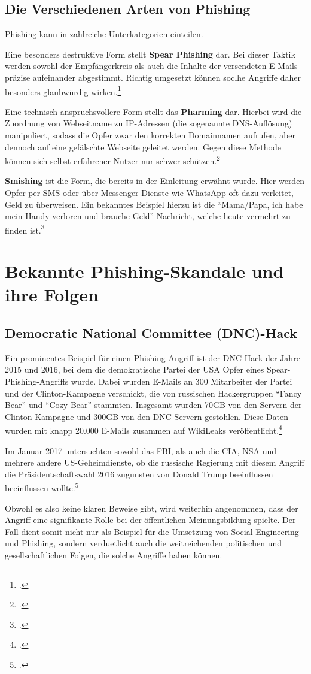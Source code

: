 \documentclass[12pt, a4paper, oneside]{scrartcl}
\begin{document}
\subsection{Die Verschiedenen Arten von Phishing}
Phishing kann in zahlreiche Unterkategorien einteilen. 
\par
Eine besonders destruktive Form stellt \textbf{Spear Phishing} dar. Bei dieser Taktik werden sowohl der Empfängerkreis als auch 
die Inhalte der versendeten E-Mails präzise aufeinander abgestimmt. Richtig umgesetzt können 
soclhe Angriffe daher besonders glaubwürdig wirken.\footcite{IBM_Phishing}
\par
Eine technisch anspruchsvollere Form stellt das \textbf{Pharming} dar. Hierbei wird die Zuordnung von Webseitname zu 
IP-Adressen (die sogenannte DNS-Auflösung) manipuliert, sodass die Opfer zwar den korrekten Domainnamen aufrufen, aber dennoch auf eine gefälschte
Webseite geleitet werden. Gegen diese Methode können sich selbst erfahrener Nutzer nur schwer schützen.\footcite{Bayern_Phaming}
\par
\textbf{Smishing} ist die Form, die bereits in der Einleitung erwähnt wurde. Hier werden Opfer per SMS oder über 
Messenger-Dienste wie WhatsApp oft dazu verleitet, Geld zu überweisen. Ein bekanntes Beispiel hierzu ist die  
``Mama/Papa, ich habe mein Handy verloren und brauche Geld''-Nachricht, welche heute vermehrt zu finden ist.\footcite{CS_10Arten}\\

\section{Bekannte Phishing-Skandale und ihre Folgen}

\subsection{Democratic National Committee (DNC)-Hack}
Ein prominentes Beispiel für einen Phishing-Angriff ist der DNC-Hack der Jahre 2015 und 2016, 
bei dem die demokratische Partei der USA Opfer eines Spear-Phishing-Angriffs wurde. 
Dabei wurden E-Mails an 300 Mitarbeiter der Partei und der Clinton-Kampagne
verschickt, die von russischen Hackergruppen ``Fancy Bear'' und ``Cozy Bear'' stammten.
Insgesamt wurden 70GB von den Servern der Clinton-Kampagne und 300GB von den DNC-Servern gestohlen.
Diese Daten wurden mit knapp 20.000 E-Mails zusammen auf WikiLeaks veröffentlicht.\footcite{IDStrong_DNC}
\par
Im Januar 2017 untersuchten sowohl das FBI, als auch die CIA, NSA und mehrere andere US-Geheimdienste, 
ob die russische Regierung mit diesem Angriff die Präsidentschaftswahl 2016 zugunsten von Donald Trump
beeinflussen beeinflussen wollte.\footcite{NYT_DNC}
\par
Obwohl es also keine klaren Beweise gibt, wird weiterhin angenommen, dass der Angriff eine 
signifikante Rolle bei der öffentlichen Meinungsbildung spielte. Der Fall dient somit nicht 
nur als Beispiel für die Umsetzung von Social Engineering und Phishing, sondern verduetlicht auch die weitreichenden 
politischen und gesellschaftlichen Folgen, die solche Angriffe haben können.
\end{document}
